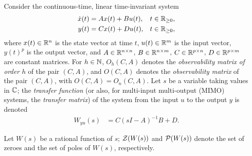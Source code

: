Consider the continuous-time, linear time-invariant system
\begin{align*}
  \dot{x}(t) &= Ax(t) + Bu(t), & t\in\mathbb{R}_{\geq 0},\\
  y(t) &= Cx(t) + Du(t), & t\in\mathbb{R}_{\geq 0},
\end{align*}
where $x(t)\in\mathbb{R}^n$ is the state vector at time $t$, $u(t)\in\mathbb{R}^m$ is the input vector, $y(t)^p$ is the output vector, and $A\in\mathbb{R}^{n \times n}$, $B\in\mathbb{R}^{n \times m}$, $C\in\mathbb{R}^{p \times n}$, $D\in\mathbb{R}^{p \times m}$ are constant matrices. For $h\in\mathbb{N}$, $O_h(C,A)$ denotes the \emph{observability matrix of order $h$} of the pair $(C,A)$, and $O(C,A)$ denotes the \emph{observability matrix} of the pair $(C,A)$, with $O(C,A)=O_n(C,A)$. Let $s$ be a variable taking values in $\mathbb{C}$; the \emph{transfer function} (or also, for multi-input multi-output (MIMO) systems, the \emph{transfer matrix}) of the system from the input $u$ to the output $y$ is denoted
\begin{align*}
  W_{yu}(s) &= C(sI-A)^{-1}B + D.
\end{align*}

Let $W(s)$ be a rational function of $s$; $\operatorname{\mathcal{Z}}(W(s))$ and $\operatorname{\mathcal{P}}(W(s))$ denote the set of zeroes and the set of poles of $W(s)$, respectively.
